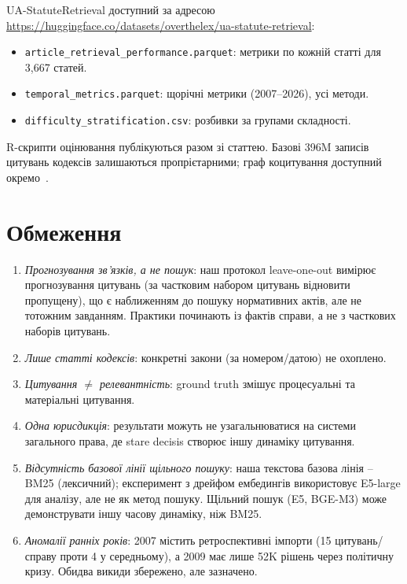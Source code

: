 \documentclass[11pt]{article}
\begin{document}
UA-StatuteRetrieval доступний за адресою \url{https://huggingface.co/datasets/overthelex/ua-statute-retrieval}:

\begin{itemize}[nosep,leftmargin=*]
  \item \texttt{article\_retrieval\_performance.parquet}: метрики по кожній статті для 3{,}667 статей.
  \item \texttt{temporal\_metrics.parquet}: щорічні метрики (2007--2026), усі методи.
  \item \texttt{difficulty\_stratification.csv}: розбивки за групами складності.
\end{itemize}

R-скрипти оцінювання публікуються разом зі статтею.
Базові 396M записів цитувань кодексів залишаються пропрієтарними; граф коцитування доступний окремо~\citep{ovcharov2025citation}.

\section{Обмеження}
\label{sec:limitations}

\begin{enumerate}[nosep,leftmargin=*]
  \item \emph{Прогнозування зв'язків, а не пошук}: наш протокол leave-one-out вимірює прогнозування цитувань (за частковим набором цитувань відновити пропущену), що є наближенням до пошуку нормативних актів, але не тотожним завданням. Практики починають із фактів справи, а не з часткових наборів цитувань.
  \item \emph{Лише статті кодексів}: конкретні закони (за номером/датою) не охоплено.
  \item \emph{Цитування $\neq$ релевантність}: ground truth змішує процесуальні та матеріальні цитування.
  \item \emph{Одна юрисдикція}: результати можуть не узагальнюватися на системи загального права, де stare decisis створює іншу динаміку цитування.
  \item \emph{Відсутність базової лінії щільного пошуку}: наша текстова базова лінія -- BM25 (лексичний); експеримент з дрейфом ембедингів використовує E5-large для аналізу, але не як метод пошуку. Щільний пошук (E5, BGE-M3) може демонструвати іншу часову динаміку, ніж BM25.
  \item \emph{Аномалії ранніх років}: 2007 містить ретроспективні імпорти (15 цитувань/справу проти 4 у середньому), а 2009 має лише 52K рішень через політичну кризу. Обидва викиди збережено, але зазначено.
\end{enumerate}
\end{document}
